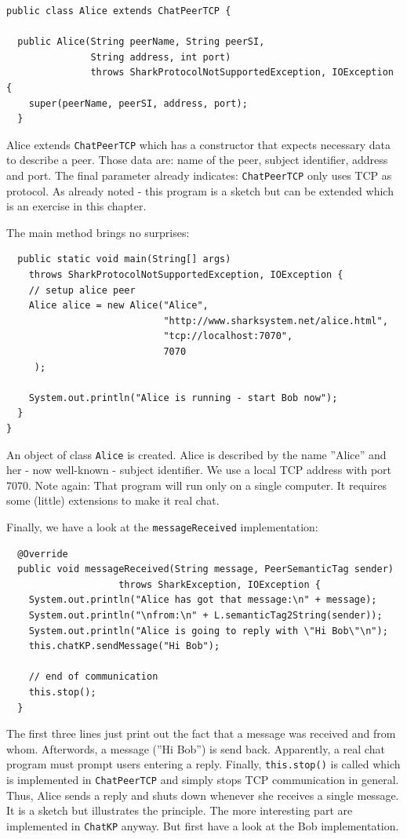 {\begin{verbatim}
public class Alice extends ChatPeerTCP {

  public Alice(String peerName, String peerSI, 
               String address, int port) 
               throws SharkProtocolNotSupportedException, IOException {
    super(peerName, peerSI, address, port);
  }
\end{verbatim}

Alice extends {\tt ChatPeerTCP} which has a constructor that expects necessary data to describe a peer. Those data are: name of the peer, subject identifier, address and port. The final parameter already indicates: {\tt ChatPeerTCP} only uses TCP as protocol. As already noted - this program is a sketch but can be extended which is an exercise in this chapter. 

The main method brings no surprises:
\begin{verbatim}
  public static void main(String[] args) 
    throws SharkProtocolNotSupportedException, IOException {
    // setup alice peer
    Alice alice = new Alice("Alice", 
                            "http://www.sharksystem.net/alice.html",
                            "tcp://localhost:7070",
                            7070
     );

    System.out.println("Alice is running - start Bob now");
  }
}
\end{verbatim}

An object of class {\tt Alice} is created. Alice is described by the name ''Alice'' and her - now well-known - subject identifier. We use a local TCP address with port 7070. Note again: That program will run only on a single computer. It requires some (little) extensions to make it real chat.

Finally, we have a look at the {\tt messageReceived} implementation:
\begin{verbatim}
  @Override
  public void messageReceived(String message, PeerSemanticTag sender) 
                    throws SharkException, IOException {
    System.out.println("Alice has got that message:\n" + message);
    System.out.println("\nfrom:\n" + L.semanticTag2String(sender));
    System.out.println("Alice is going to reply with \"Hi Bob\"\n");
    this.chatKP.sendMessage("Hi Bob");

    // end of communication
    this.stop();
  }    
\end{verbatim}

The first three lines just print out the fact that a message was
received and from whom. Afterwords, a message (''Hi Bob'') is send
back. Apparently, a real chat program must prompt users entering
a reply. Finally, {\tt this.stop()} is called which is implemented in
{\tt ChatPeerTCP} and simply stops TCP communication in general. Thus, 
Alice sends a reply and shuts down whenever she receives a single message.
It is a sketch but illustrates the principle. The more interesting part are
implemented in {\tt ChatKP} anyway. But first have a look at the Bob implementation.

}
